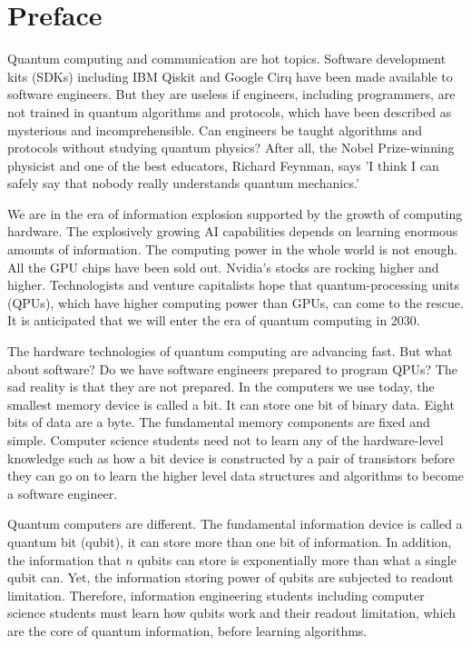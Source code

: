 \documentclass[oneside, letter, 12pt]{book}
\begin{document}



\chapter*{Preface}
Quantum computing and communication are hot topics. Software development kits (SDKs) including IBM Qiskit and Google Cirq have been made available to software engineers. But they are useless if engineers, including programmers, are not trained in quantum algorithms and protocols, which have been described as mysterious and incomprehensible. Can engineers be taught algorithms and protocols without studying quantum physics? After all, the Nobel Prize-winning physicist and one of the best educators, Richard Feynman, says 'I think I can safely say that nobody really understands quantum mechanics.'

We are in the era of information explosion supported by the growth of computing hardware. The explosively growing AI capabilities depends on learning enormous amounts of information. The computing power in the whole world is not enough. All the GPU chips have been sold out. Nvidia's stocks are rocking higher and higher. Technologists and venture capitalists hope that quantum-processing units (QPUs), which have higher computing power than GPUs, can come to the rescue. It is anticipated that we will enter the era of quantum computing in 2030.

The hardware technologies of quantum computing are advancing fast. But what about software? Do we have software engineers prepared to program QPUs? The sad reality is that they are not prepared. In the computers we use today, the smallest memory device is called a bit. It can store one bit of binary data. Eight bits of data are a byte. The fundamental memory components are fixed and simple. Computer science students need not to learn any of the hardware-level knowledge such as how a bit device is constructed by a pair of transistors before they can go on to learn the higher level data structures and algorithms to become a software engineer.

Quantum computers are different. The fundamental information device is called a quantum bit (qubit), it can store more than one bit of information. In addition, the information that $n$ qubits can store is exponentially more than what a single qubit can. Yet, the information storing power of qubits are subjected to readout limitation. Therefore, information engineering students including computer science students must learn how qubits work and their readout limitation, which are the core of quantum information, before learning algorithms.
\end{document}
